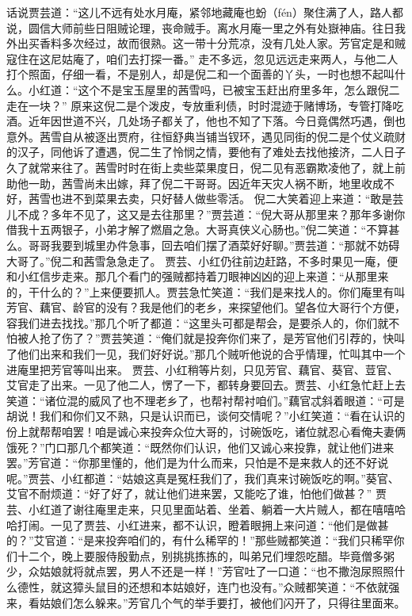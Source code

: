 \documentclass[12pt,oneside]{book}
\begin{document}
话说贾芸道：“这儿不远有处水月庵，紧邻地藏庵也蚡（fén）聚住满了人，路人都说，圆信大师前些日阻贼论理，丧命贼手。离水月庵一里之外有处嶽神庙。往日我外出买香料多次经过，故而很熟。这一带十分荒凉，没有几处人家。芳官定是和贼寇住在这尼姑庵了，咱们去打探一番。”
走不多远，忽见远远走来两人，与他二人打个照面，仔细一看，不是别人，却是倪二和一个面善的丫头，一时也想不起叫什么。小红道：“这个不是宝玉屋里的茜雪吗，已被宝玉赶出府里多年，怎么跟倪二走在一块？”
原来这倪二是个泼皮，专放重利债，时时混迹于赌博场，专管打降吃酒。近年因世道不兴，几处场子都关了，他也不知了下落。今日竟偶然巧遇，倒也意外。茜雪自从被逐出贾府，往恒舒典当铺当钗环，遇见同街的倪二是个仗义疏财的汉子，同他诉了遭遇，倪二生了怜悯之情，要他有了难处去找他接济，二人日子久了就常来往了。茜雪时时在街上卖些菜果度日，倪二见有恶霸欺凌他了，就上前助他一助，茜雪尚未出嫁，拜了倪二干哥哥。因近年天灾人祸不断，地里收成不好，茜雪也进不到菜果去卖，只好替人做些零活。
倪二大笑着迎上来道：“敢是芸儿不成？多年不见了，这又是去往那里？”贾芸道：“倪大哥从那里来？那年多谢你借我十五两银子，小弟才解了燃眉之急。大哥真侠义心肠也。”倪二笑道：“不算甚么。哥哥我要到城里办件急事，回去咱们摆了酒菜好好聊。”贾芸道：“那就不妨碍大哥了。”倪二和茜雪急急走了。
贾芸、小红仍往前边赶路，不多时果见一庵，便和小红信步走来。那几个看门的强贼都持着刀眼神凶凶的迎上来道：“从那里来的，干什么的？”上来便要抓人。贾芸急忙笑道：“我们是来找人的。你们庵里有叫芳官、藕官、龄官的没有？我是他们的老乡，来探望他们。望各位大哥行个方便，容我们进去找找。”那几个听了都道：“这里头可都是帮会，是要杀人的，你们就不怕被人抢了伤了？”贾芸笑道：“俺们就是投奔你们来了，是芳官他们引荐的，快叫了他们出来和我们一见，我们好好说。”那几个贼听他说的合乎情理，忙叫其中一个进庵里把芳官等叫出来。
贾芸、小红稍等片刻，只见芳官、藕官、葵官、荳官、艾官走了出来。一见了他二人，愣了一下，都转身要回去。贾芸、小红急忙赶上去笑道：“诸位混的威风了也不理老乡了，也帮衬帮衬咱们。”藕官忒斜着眼道：“可是胡说！我们和你们又不熟，只是认识而已，谈何交情呢？”小红笑道：“看在认识的份上就帮帮咱罢！咱是诚心来投奔众位大哥的，讨碗饭吃，诸位就忍心看俺夫妻俩饿死？”门口那几个都笑道：“既然你们认识，他们又诚心来投靠，就让他们进来罢。”芳官道：“你那里懂的，他们是为什么而来，只怕是不是来救人的还不好说呢。”贾芸、小红都道：“姑娘这真是冤枉我们了，我们真来讨碗饭吃的啊。”葵官、艾官不耐烦道：“好了好了，就让他们进来罢，又能吃了谁，怕他们做甚？”
贾芸、小红道了谢往庵里走来，只见里面站着、坐着、躺着一大片贼人，都在嘻嘻哈哈打闹。一见了贾芸、小红进来，都不认识，瞪着眼拥上来问道：“他们是做甚的？”艾官道：“是来投奔咱们的，有什么稀罕的！”那些贼都笑道：“我们只稀罕你们十二个，晚上要服侍殷勤点，别挑挑拣拣的，叫弟兄们埋怨吃醋。毕竟僧多粥少，众姑娘就将就点罢，男人不还是一样！”芳官吐了一口道：“也不撒泡尿照照什么德性，就这獐头鼠目的还想和本姑娘好，连门也没有。”众贼都笑道：“不依就强来，看姑娘们怎么躲来。”芳官几个气的举手要打，被他们闪开了，只得往里面来。
\end{document}
